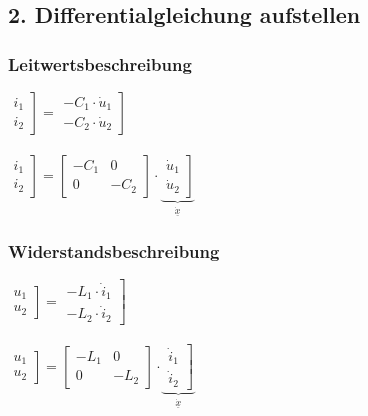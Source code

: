 \documentclass[a4paper,twocolumn,10pt]{article}
\begin{document}
\subsection*{2. Differentialgleichung aufstellen}
\begin{minipage}[t]{0.23\textwidth}
\subsubsection*{Leitwertsbeschreibung}
$\left.\begin{matrix}i_1 \\ i_2\end{matrix}\right]=\left.\begin{matrix}-C_1\cdot \dot u_1 \\ -C_2\cdot \dot u_2\end{matrix}\right]$\\\\
$\left.\begin{matrix}i_1 \\ i_2\end{matrix}\right]=\begin{bmatrix}-C_1 & 0 \\ 0 & -C_2\end{bmatrix}\cdot \underbrace{\left.\begin{matrix}\dot u_1 \\ \dot u_2\end{matrix}\right]}_{\underline{\dot x}}$
\end{minipage}
\hfill
\begin{minipage}[t]{0.23\textwidth}
\subsubsection*{Widerstandsbeschreibung}
$\left.\begin{matrix}u_1 \\ u_2\end{matrix}\right]=\left.\begin{matrix}-L_1\cdot \dot i_1 \\ -L_2\cdot \dot i_2\end{matrix}\right]$\\\\
$\left.\begin{matrix}u_1 \\ u_2\end{matrix}\right]=\begin{bmatrix}-L_1 & 0 \\ 0 & -L_2\end{bmatrix}\cdot \underbrace{\left.\begin{matrix}\dot i_1 \\ \dot i_2\end{matrix}\right]}_{\underline{\dot x}}$
\end{minipage}\\\\\\
\end{document}
